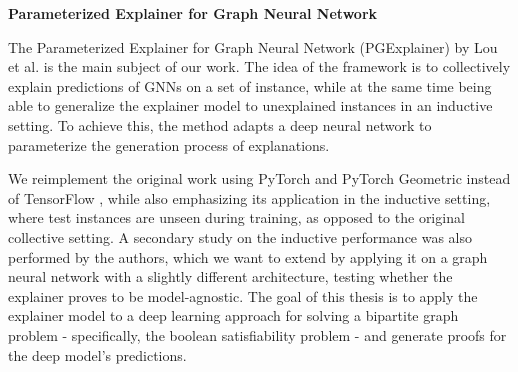 \textbf{Parameterized Explainer for Graph Neural Network} \par
The Parameterized Explainer for Graph Neural Network (PGExplainer) by Lou et al. \cite{luo2020parameterized} is the main subject of our work. The idea of the framework is to collectively explain predictions of GNNs on a set of instance, while at the same time being able to generalize the explainer model to unexplained instances in an inductive setting. To achieve this, the method adapts a deep neural network to parameterize the generation process of explanations. %

We reimplement the original work using PyTorch \cite{paszke2019pytorch} and PyTorch Geometric \cite{Fey/Lenssen/2019} instead of TensorFlow \cite{tensorflow2015-whitepaper}, while also emphasizing its application in the inductive setting, where test instances are unseen during training, as opposed to the original collective setting. A secondary study on the inductive performance was also performed by the authors, which we want to extend by applying it on a graph neural network with a slightly different architecture, testing whether the explainer proves to be model-agnostic. The goal of this thesis is to apply the explainer model to a deep learning approach for solving a bipartite graph problem - specifically, the boolean satisfiability problem - and generate proofs for the deep model's predictions. \bigskip


